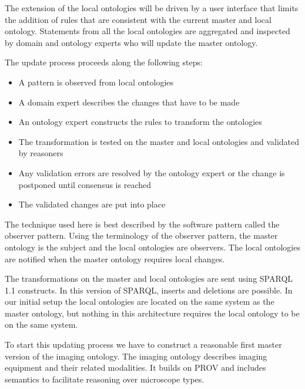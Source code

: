 The extension of the local ontologies will be driven by a user
interface that limits the addition of rules that are consistent with
the current master and local ontology. Statements from all the local
ontologies are aggregated and inspected by domain and ontology experts
who will update the master ontology.

The update process proceeds along the following steps:
\begin{itemize}
  \item A pattern is observed from local ontologies
  \item A domain expert describes the changes that have to be made
  \item An ontology expert constructs the rules to transform the ontologies
  \item The transformation is tested on the master and local ontologies and validated by reasoners
  \item Any validation errors are resolved by the ontology expert or the change is postponed until consensus is reached
  \item The validated changes are put into place
\end{itemize}

The technique used here is best described by the software pattern
called the observer pattern. Using the terminology of the observer
pattern, the master ontology is the subject and the local ontologies
are observers. The local ontologies are notified when the master
ontology requires local changes.

The transformations on the master and local ontologies are sent using
SPARQL 1.1 constructs. In this version of SPARQL,
inserts and deletions are possible. In our initial setup the local
ontologies are located on the same system as the master ontology, but
nothing in this architecture requires the local ontology to be on the
same system.

To start this updating process we have to construct a reasonable first
master version of the imaging ontology. The imaging
ontology
describes imaging equipment and their related
modalities. It builds on PROV and includes
semantics to facilitate reasoning
over microscope types.




